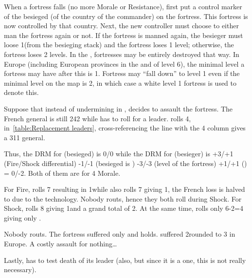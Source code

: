 When a fortress falls (no more Morale or Resistance), first put a control
marker of the besieged (of the country of the commander) on the fortress. This
fortress is now controlled by that country. Next, the new controller must
choose to either man the fortress again or not. If the fortress is manned
again, the besieger must loose 1\LD (from the besieging stack) and the
fortress loses 1 level; otherwise, the fortress loses 2 levels. In the \ROTW,
fortresses may be entirely destroyed that way. In Europe (including European
provinces in the \ROTW and \COL of level 6), the minimal level a fortress may
have after this is 1. Fortress may ``fall down'' to level 1 even if the
minimal level on the map is 2, in which case a white level 1 fortress is used
to denote this.

\begin{exemple}[Assault]
  Suppose that instead of undermining in \provinceArtois, \FRA decides to
  assault the fortress. The French general is still 242 while \HIS has to roll
  for a  leader. \HIS rolls 4, in~\ref{table:Replacement
    leaders}, cross-referencing the \HIS line with the 4 column gives a 311
  general.

  Thus, the DRM for \HIS (besieged) is 0/0 while the DRM for \FRA (besieger)
  is +3/+1 (Fire/Shock differential) -1/-1 (besieged is \TARQ) -3/-3 (level of
  the fortress) +1/+1 () = 0/-2. Both of them are
   for 4 Morale.

  For Fire, \HIS rolls 7 resulting in 1\textetoile while \FRA also rolls 7
  giving 1\textetoile, the French loss is halved to \texttu due to the \TARQ
  technology. Nobody routs, hence they both roll during Shock. For Shock, \HIS
  rolls 8 giving 1\texttd\textetoile\textetoile and a grand total of
  2\texttd\textetoile\textetoile\textetoile. At the same time, \FRA rolls only
  6-2=4 giving only \texttu.

  Nobody routs. The fortress suffered only \texttd and holds. \FRA suffered
  2\texttd rounded to 3 in Europe. A costly assault for nothing\ldots

  Lastly, \FRA has to test death of its leader (\HIS also, but since it is a
   one, this is not really necessary).
\end{exemple}

